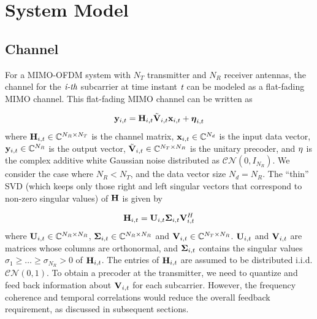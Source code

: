 \documentclass[11pt,a4paper]{report}
\def\bx{{\bf x}}
\def\by{{\bf y}}
\def\bSigma{{\bf \Sigma}}
\def\bH{{\bf H}}
\def\bU{{\bf U}}
\def\bV{{\bf V}}
\begin{document}
\chapter{System Model}
\label{chap:sysMod}

\section{Channel}
For a MIMO-OFDM system with $N_T$ transmitter and $N_R$
receiver antennas, the channel for the $\emph{i-th}$ subcarrier at time
instant $\emph{t}$ can be modeled as a flat-fading MIMO channel. This
flat-fading MIMO channel can be written as

\begin{equation}
\by_{i,t} = \bH_{i,t}\tilde{\bV}_{i,t} \bx_{i,t}+ {\boldsymbol{\eta}}_{i,t}
\end{equation}
where $\bH_{i,t} \in {\mathbb{C}}^{N_R \times N_T}$ is the channel
matrix, $\bx_{i,t} \in {\mathbb{C}}^{N_d}$ is the input data vector,
$\by_{i,t} \in {\mathbb{C}}^{N_R}$ is the output vector,
$\tilde{\bV}_{i,t} \in {\mathbb{C}}^{N_T \times N_R}$ is the unitary
precoder, and $\bf{\eta}$ is the complex additive white Gaussian noise
distributed as ${\mathcal{CN}}(0,I_{N_R})$. We consider the case where
$N_R < N_T$, and the data vector size $N_d = N_R$.  The ``thin'' SVD
(which keeps only those right and left singular vectors that correspond
to non-zero singular values) of $\bH$ is given by

\begin{equation}
\bH_{i,t} = \bU_{i,t} \bSigma_{i,t} \bV_{i,t}^{H}
\end{equation}
where $\bU_{i,t} \in \mathbb{C}^{N_R \times N_R}$,
$\bSigma_{i,t} \in \mathbb{C}^{N_R \times N_R}$ and
$\bV_{i,t} \in \mathbb{C}^{N_T \times N_R}$. $\bU_{i,t}$ and
$\bV_{i,t}$ are matrices whose columns are orthonormal, and
$\bSigma_{i,t}$ contains the singular values
$\sigma_1 \geq \ldots \geq \sigma_{N_R} > 0$ of $\bH_{i,t}$. The
entries of $\bH_{i,t}$ are assumed to be distributed
i.i.d. $\mathcal{CN}(0,1)$. To obtain a precoder at the
transmitter, we need to quantize and feed back information about
$\bV_{i,t}$ for each subcarrier. However, the frequency coherence and
temporal correlations would reduce the overall feedback requirement,
as discussed in subsequent sections.

\end{document}
